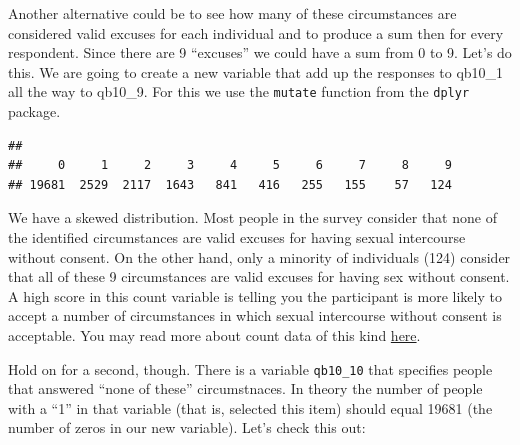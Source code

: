 \documentclass[]{book}
\newenvironment{Shaded}{\begin{snugshade}}{\end{snugshade}}
\newcommand{\DataTypeTok}[1]{\textcolor[rgb]{0.13,0.29,0.53}{#1}}
\newcommand{\DecValTok}[1]{\textcolor[rgb]{0.00,0.00,0.81}{#1}}
\newcommand{\KeywordTok}[1]{\textcolor[rgb]{0.13,0.29,0.53}{\textbf{#1}}}
\newcommand{\NormalTok}[1]{#1}
\newcommand{\OperatorTok}[1]{\textcolor[rgb]{0.81,0.36,0.00}{\textbf{#1}}}
\newcommand{\StringTok}[1]{\textcolor[rgb]{0.31,0.60,0.02}{#1}}
\theoremstyle{definition}
\theoremstyle{definition}
\theoremstyle{definition}
\theoremstyle{remark}
\begin{document}
Another alternative could be to see how many of these circumstances are
considered valid excuses for each individual and to produce a sum then
for every respondent. Since there are 9 ``excuses'' we could have a sum
from 0 to 9. Let's do this. We are going to create a new variable that
add up the responses to qb10\_1 all the way to qb10\_9. For this we use
the \texttt{mutate} function from the \texttt{dplyr} package.

\begin{Shaded}
\end{Shaded}

\begin{verbatim}
## 
##     0     1     2     3     4     5     6     7     8     9 
## 19681  2529  2117  1643   841   416   255   155    57   124
\end{verbatim}

We have a skewed distribution. Most people in the survey consider that
none of the identified circumstances are valid excuses for having sexual
intercourse without consent. On the other hand, only a minority of
individuals (124) consider that all of these 9 circumstances are valid
excuses for having sex without consent. A high score in this count
variable is telling you the participant is more likely to accept a
number of circumstances in which sexual intercourse without consent is
acceptable. You may read more about count data of this kind
\href{https://en.wikipedia.org/wiki/Count_data}{here}.

Hold on for a second, though. There is a variable \texttt{qb10\_10} that
specifies people that answered ``none of these'' circumstnaces. In
theory the number of people with a ``1'' in that variable (that is,
selected this item) should equal 19681 (the number of zeros in our new
variable). Let's check this out:
\end{document}
